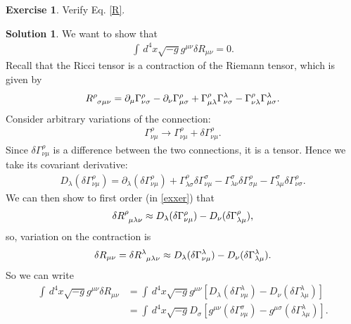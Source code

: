 \documentclass[a4paper,11pt]{article}
\numberwithin{equation}{section}
\theoremstyle{definition}
\newtheorem{exmp}{Exercise}[section]
\newtheorem{sln}{Solution}[section]
\newcommand{\p}{\partial}
\newcommand{\lb}{\left[}
\newcommand{\rb}{\right]}
\begin{document}
\begin{exmp}
	Verify Eq. \eqref{R}.\\
	
	\begin{sln}
		We want to show that
		\begin{align}
		\int \,d^4x \sqrt{-g}g^{\mu\nu}\delta R_{\mu\nu} = 0.
		\end{align}
		Recall that the Ricci tensor is a contraction of the Riemann tensor, which is given by
		\begin{align}
		\tensor{R}{^\rho_{\sigma\mu\nu}} = \p_\mu \Gamma^\rho_{\nu\sigma} - \p_\nu \Gamma^\rho_{\mu\sigma} + \Gamma^\rho _{\mu\lambda}\Gamma^\lambda_{\nu\sigma} - \Gamma^\rho_{\nu\lambda} \Gamma^\lambda_{\mu\sigma}.
		\end{align}
		Consider arbitrary variations of the connection:
		\begin{align}
		\Gamma^\rho_{\nu\mu} \to \Gamma^\rho_{\nu\mu} + \delta \Gamma^\rho_{\nu\mu}.
		\end{align}
		Since $\delta \Gamma^\rho_{\nu\mu}$ is a difference between the two connections, it is a tensor. Hence we take its covariant derivative:
		\begin{align}
		D_\lambda (\delta \Gamma^\rho_{\nu\mu}) = \p_\lambda (\delta \Gamma^\rho_{\nu\mu}) + \Gamma^\rho_{\lambda\sigma} \delta \Gamma^\sigma_{\nu\mu} - \Gamma^\sigma_{\lambda\nu} \delta \Gamma^\rho_{\sigma\mu} - \Gamma^\sigma_{\lambda\mu} \delta \Gamma^\rho_{\nu\sigma}.
		\end{align}
		We can then show to first order (in \ref{exxer}) that
		\begin{align}\label{approx}
		\delta \tensor{R}{^\rho_{\mu\lambda\nu}} \approx D_\lambda (\delta \Gamma^\rho_{\nu\mu}) - D_\nu (\delta \Gamma^\rho_{\lambda\mu}),
		\end{align}
		so, variation on the contraction is
		\begin{align}
		\delta R_{\mu\nu} = \delta \tensor{R}{^\lambda_{\mu\lambda\nu}} \approx D_\lambda (\delta \Gamma^\lambda_{\nu\mu}) - D_\nu (\delta \Gamma^\lambda_{\lambda\mu}).
		\end{align}
		So we can write
		\begin{align}\label{step}
		\int \,d^4x \sqrt{-g}g^{\mu\nu}\delta R_{\mu\nu} &= \int \,d^4x \sqrt{-g}g^{\mu\nu} \lb D_\lambda (\delta \Gamma^\lambda_{\nu\mu}) - D_\nu (\delta \Gamma^\lambda_{\lambda\mu})  \rb\\
		&= \int \,d^4x \sqrt{-g}   D_\sigma \lb g^{\mu\nu} (\delta \Gamma^\sigma_{\nu\mu}) - g^{\mu\sigma} (\delta \Gamma^\lambda_{\lambda\mu})  \rb.

\end{align}
\end{sln}
\end{exmp}
\end{document}
